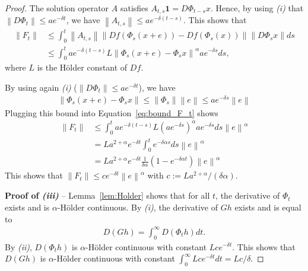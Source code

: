 \documentclass[sigconf]{acmart}
\newcommand\norm[1]{\left\|#1\right\|}
\begin{document}
\begin{proof}
  The solution operator $A$ satisfies
  $A_{t,s}\mathbf{1}=D\Phi_{t-s}x$. Hence, by using \emph{(i)} that
  $\norm{D\Phi_t}\le ae^{-\delta t}$, we have
  $\norm{A_{t,s}}\le ae^{-\delta (t-s)}$. This shows that
  \begin{align}
    \norm{F_t}&\le\int_0^t
                \norm{A_{t,s}}\norm{Df(\Phi_s(x+e))-Df(\Phi_s(x))}\norm{D\Phi_sx}ds
                \nonumber\\ 
              &\le \int_0^t ae^{-\delta (t-s)}
                L\norm{\Phi_s(x+e)-\Phi_sx}^\alpha a e^{-\delta s}ds,
                \label{eq:bound_F_t}
  \end{align}
  where $L$ is the Hölder constant of $Df$. 

  By using again \emph{(i)} ($\norm{D\Phi_t}\le ae^{-\delta t}$), we
  have
  \begin{align*}
    \norm{\Phi_s(x+e)-\Phi_sx} \le \norm{\Phi_s}\norm{e} \le
    ae^{-\delta s}\norm{e}
  \end{align*}
  Plugging this bound into Equation~\eqref{eq:bound_F_t} shows
  \begin{align*}
    \norm{F_t}&\le \int_0^t ae^{-\delta (t-s)}
                L(a e^{-\delta s})^\alpha  a e^{-\delta
                s}ds \norm{e}^\alpha \\
              &= L a^{2+\alpha} e^{-\delta t} \int_0^t
                e^{-\delta\alpha s}ds\norm{e}^\alpha\\
              & = L a^{2+\alpha} e^{-\delta t} \frac{1}{\delta \alpha}
                (1-e^{-\delta\alpha t})\norm{e}^\alpha
  \end{align*}
  This shows that $\norm{F_t}\le c e^{-\delta t}\norm{e}^\alpha$ with
  $c:=L a^{2+\alpha}/(\delta\alpha)$.


  \textbf{Proof of \emph{(iii)}} -- Lemma~\ref{lem:Holder} shows that
  for all $t$, the derivative of $\Phi_t$ exists and is
  $\alpha$-Hölder continuous. By \emph{(i)}, the derivative of $Gh$
  exists and is equal to 
  \begin{align*}
    D(Gh)= \int_0^\infty D(\Phi_th) dt. 
  \end{align*}
  By \emph{(ii)}, $D(\Phi_th)$ is $\alpha$-Hölder continuous with
  constant $Lce^{-\delta t}$. This shows that $D(Gh)$ is
  $\alpha$-Hölder continuous with constant $\int_0^\infty Lce^{-\delta
    t}dt = Lc/\delta$. 
\end{proof}
\end{document}

